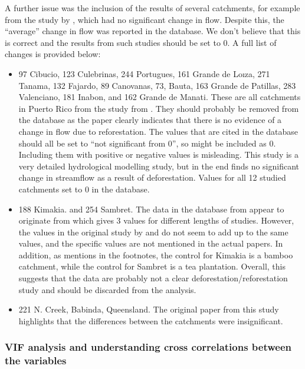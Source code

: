 \documentclass[]{elsarticle} %
\providecommand{\tightlist}{%
  \setlength{\itemsep}{0pt}\setlength{\parskip}{0pt}}
\begin{document}
A further issue was the inclusion of the results of several catchments, for example from the study by \citet{beck2013}, which had no significant change in flow. Despite this, the ``average'' change in flow was reported in the database. We don't believe that this is correct and the results from such studies should be set to 0. A full list of changes is provided below:

\begin{itemize}
\tightlist
\item
  97 Cibucio, 123 Culebrinas, 244 Portugues, 161 Grande de Loıza, 271 Tanama, 132 Fajardo, 89 Canovanas, 73, Bauta, 163 Grande de Patillas, 283 Valenciano, 181 Inabon, and 162 Grande de Manati. These are all catchments in Puerto Rico from the study from \citet{beck2013}. They should probably be removed from the database as the paper clearly indicates that there is no evidence of a change in flow due to reforestation. The values that are cited in the database should all be set to ``not significant from 0'', so might be included as 0. Including them with positive or negative values is misleading. This study is a very detailed hydrological modelling study, but in the end finds no significant change in streamflow as a result of deforestation. Values for all 12 studied catchments set to 0 in the database.\\
\item
  188 Kimakia. and 254 Sambret. The data in the database from \citet{zhang2017} appear to originate from \citet{bruijnzeel1990} which gives 3 values for different lengths of studies. However, the values in the original study by \citet{blackie1979kimakia} and \citet{blackie1979kericho} do not seem to add up to the same values, and the specific values are not mentioned in the actual papers. In addition, as \citet{bruijnzeel1990} mentions in the footnotes, the control for Kimakia is a bamboo catchment, while the control for Sambret is a tea plantation. Overall, this suggests that the data are probably not a clear deforestation/reforestation study and should be discarded from the analysis.
\item
  221 N. Creek, Babinda, Queensland. The original paper from this study highlights that the differences between the catchments were insignificant.
\end{itemize}

\hypertarget{vif-analysis-and-understanding-cross-correlations-between-the-variables}{%
\subsubsection{VIF analysis and understanding cross correlations between the variables}\label{vif-analysis-and-understanding-cross-correlations-between-the-variables}}
\end{document}
